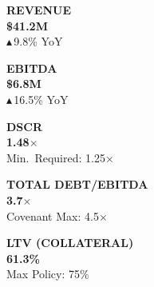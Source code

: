 \documentclass[11pt,a4paper]{article}
\begin{document}
\noindent
\begin{minipage}[t]{0.185\textwidth}
  \begin{tcolorbox}[metricbox, height=32mm]
    \centering
    {\color{SlateGray}\scriptsize\bfseries REVENUE}\\[4pt]
    {\color{NavyInk}\bfseries\large\$41.2M}\\[2pt]
    {\color{GreenOK}\scriptsize $\blacktriangle$\,9.8\% YoY}
  \end{tcolorbox}
\end{minipage}%
\hspace{2mm}%
\begin{minipage}[t]{0.185\textwidth}
  \begin{tcolorbox}[metricbox, height=32mm]
    \centering
    {\color{SlateGray}\scriptsize\bfseries EBITDA}\\[4pt]
    {\color{NavyInk}\bfseries\large\$6.8M}\\[2pt]
    {\color{GreenOK}\scriptsize $\blacktriangle$\,16.5\% YoY}
  \end{tcolorbox}
\end{minipage}%
\hspace{2mm}%
\begin{minipage}[t]{0.185\textwidth}
  \begin{tcolorbox}[metricbox, height=32mm]
    \centering
    {\color{SlateGray}\scriptsize\bfseries DSCR}\\[4pt]
    {\color{NavyInk}\bfseries\large 1.48$\times$}\\[2pt]
    {\color{SlateGray}\scriptsize Min.\ Required: 1.25$\times$}
  \end{tcolorbox}
\end{minipage}%
\hspace{2mm}%
\begin{minipage}[t]{0.185\textwidth}
  \begin{tcolorbox}[metricbox, height=32mm]
    \centering
    {\color{SlateGray}\scriptsize\bfseries TOTAL DEBT/EBITDA}\\[4pt]
    {\color{NavyInk}\bfseries\large 3.7$\times$}\\[2pt]
    {\color{SlateGray}\scriptsize Covenant Max: 4.5$\times$}
  \end{tcolorbox}
\end{minipage}%
\hspace{2mm}%
\begin{minipage}[t]{0.185\textwidth}
  \begin{tcolorbox}[metricbox, height=32mm]
    \centering
    {\color{SlateGray}\scriptsize\bfseries LTV (COLLATERAL)}\\[4pt]
    {\color{NavyInk}\bfseries\large 61.3\%}\\[2pt]
    {\color{SlateGray}\scriptsize Max Policy: 75\%}
  \end{tcolorbox}
\end{minipage}
\end{document}
